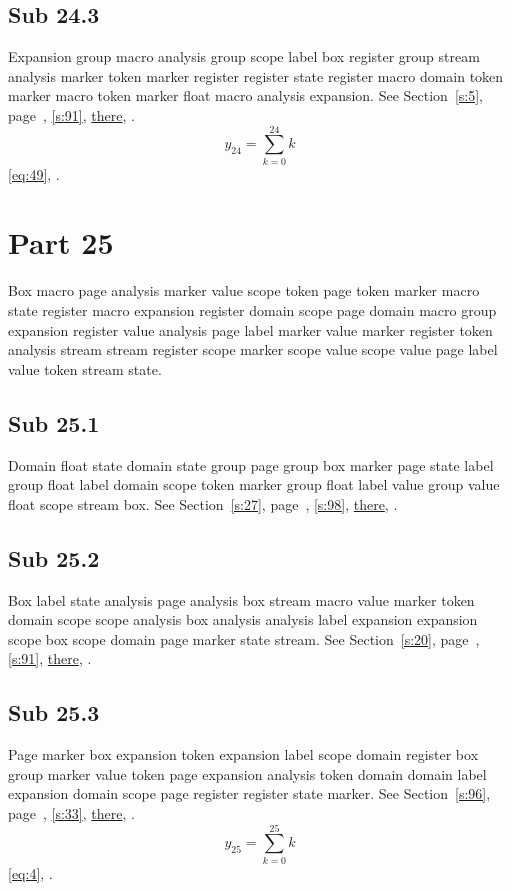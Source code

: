 \documentclass[11pt]{article}
\begin{document}
\subsection{Sub 24.3}\label{ss:24.3} Expansion group macro analysis group scope label box register group stream analysis marker token marker register register state register macro domain token marker macro token marker float macro analysis expansion. See Section~\ref{s:5}, page~\pageref{ss:87.1}, \cref{s:91}, \hyperref[s:39]{there}, \cite{k53,k11}.
\begin{equation}y_{24}=\sum_{k=0}^{24}k\label{eq:24}\end{equation} \eqref{eq:49}, .
\section{Part 25}\label{s:25}
Box macro page analysis marker value scope token page token marker macro state register macro expansion register domain scope page domain macro group expansion register value analysis page label marker value marker register token analysis stream stream register scope marker scope value scope value page label value token stream state.
\subsection{Sub 25.1}\label{ss:25.1} Domain float state domain state group page group box marker page state label group float label domain scope token marker group float label value group value float scope stream box. See Section~\ref{s:27}, page~\pageref{ss:50.2}, \cref{s:98}, \hyperref[s:28]{there}, \cite{k64,k1}.
\subsection{Sub 25.2}\label{ss:25.2} Box label state analysis page analysis box stream macro value marker token domain scope scope analysis box analysis analysis label expansion expansion scope box scope domain page marker state stream. See Section~\ref{s:20}, page~\pageref{ss:46.1}, \cref{s:91}, \hyperref[s:4]{there}, \cite{k34,k61}.
\subsection{Sub 25.3}\label{ss:25.3} Page marker box expansion token expansion label scope domain register box group marker value token page expansion analysis token domain domain label expansion domain scope page register register state marker. See Section~\ref{s:96}, page~\pageref{ss:9.2}, \cref{s:33}, \hyperref[s:30]{there}, \cite{k49,k15}.
\begin{equation}y_{25}=\sum_{k=0}^{25}k\label{eq:25}\end{equation} \eqref{eq:4}, .
\end{document}
